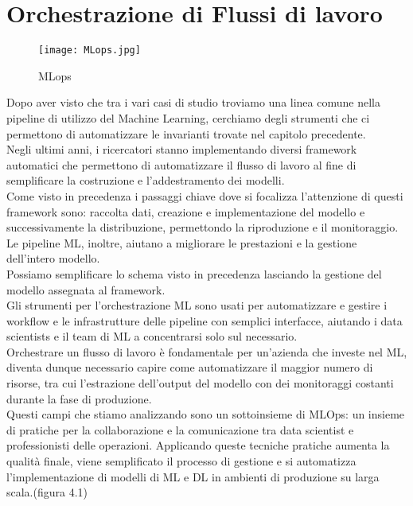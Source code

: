 \documentclass[../tesi.tex]{subfiles}
\begin{document}
\chapter{Orchestrazione di Flussi di lavoro}

\begin{figure}[htbp]
  \centering
  \texttt{[image: MLops.jpg]} 
  \caption{MLops}
  \end{figure}

 
Dopo aver visto che tra i vari casi di studio troviamo una linea comune nella \Gls{pipeline} di utilizzo del Machine Learning, cerchiamo degli strumenti che ci permettono di automatizzare le invarianti trovate nel capitolo precedente.\\
Negli ultimi anni, i ricercatori stanno implementando diversi \Gls{framework} automatici che permettono di automatizzare il flusso di lavoro al fine di semplificare la costruzione e l'addestramento dei modelli.\\
Come visto in precedenza i passaggi chiave dove si focalizza l'attenzione di questi framework sono: raccolta dati, creazione e implementazione del modello e successivamente la distribuzione, permettondo la riproduzione e il monitoraggio.\\
Le \Gls{pipeline} ML, inoltre, aiutano a migliorare le prestazioni e la gestione dell'intero modello.\\
Possiamo semplificare lo schema visto in precedenza lasciando la gestione del modello assegnata al \Gls{framework}.\\
Gli strumenti per l’orchestrazione ML sono usati per automatizzare e gestire i workflow e le infrastrutture delle \Gls{pipeline} con semplici interfacce, aiutando i data scientists e il team di ML a concentrarsi solo sul necessario.\\
Orchestrare un flusso di lavoro è fondamentale per un’azienda che investe nel ML, diventa dunque necessario capire come automatizzare il maggior numero di risorse, tra cui l’estrazione dell’output del modello con dei monitoraggi costanti durante la fase di produzione.\\
Questi campi che stiamo analizzando sono un sottoinsieme di MLOps: un insieme di pratiche per la collaborazione e la comunicazione tra data scientist e professionisti delle operazioni. Applicando queste tecniche pratiche aumenta la qualità finale, viene semplificato il processo di gestione e si automatizza l’implementazione di modelli di ML e DL in ambienti di produzione su larga scala.(figura 4.1)
\cite{articleNeptune,frameworkArticleNeptune,googleArticle}
\end{document}
